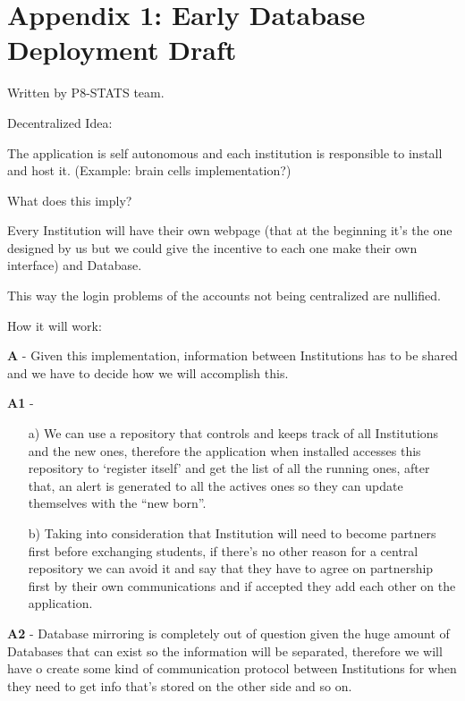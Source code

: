 \chapter{Appendix 1: Early Database Deployment Draft}

Written by P8-STATS team.

Decentralized Idea:


The application is self autonomous and each institution is responsible to
install and host it. (Example: brain cells implementation?)


\noindent What does this imply?

\noindent Every Institution will have their own webpage (that at the beginning
it’s the one designed by us but we could give the incentive to each one make
their own interface) and Database.

This way the login problems of the accounts not being centralized are
nullified.


How it will work:


\textbf{A} - Given this implementation, information between Institutions has to
be shared and we have to decide how we will accomplish this.


\textbf{A1} -
\begin{itemize}
\item[a)] We can use a repository that controls and keeps track of all Institutions and
the new ones, therefore the application when installed accesses this repository
to ‘register itself’ and get the list of all the running ones, after that, an
alert is generated to all the actives ones so they can update themselves with
the “new born”.
\item[b)] Taking into consideration that Institution will need to become partners first
before exchanging students, if there’s no other reason for a central repository
we can avoid it and say that they have to agree on partnership first by their
own communications and if accepted they add each other on the application.
\end{itemize}

\textbf{A2} - Database mirroring is completely out of question given the huge
amount of Databases that can exist so the information will be separated,
therefore we will have o create some kind of communication protocol between Institutions for when
they need to get info that’s stored on the other side and so on.


